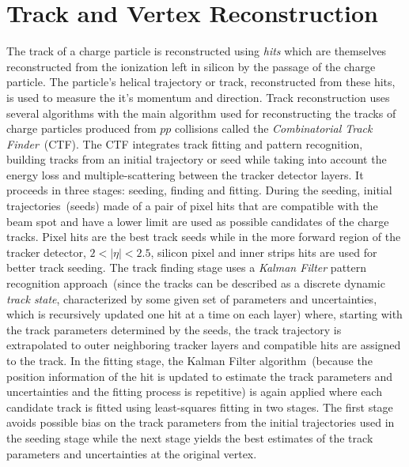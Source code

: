 \section{Track and Vertex Reconstruction}
The track of a charge particle is reconstructed using \textit{hits} which are themselves reconstructed from the ionization left in silicon by the passage of the charge particle. The particle's helical trajectory or track, reconstructed from these hits, is used to measure the it's momentum and direction.
\newline
Track reconstruction uses several algorithms with the main algorithm used for reconstructing the tracks of charge particles produced from $pp$ collisions called the \textit{Combinatorial Track Finder}~(CTF). The CTF integrates track fitting and pattern recognition, building tracks from an initial trajectory or seed while taking into account the energy loss and multiple-scattering between the tracker detector layers. It proceeds in three stages: seeding, finding and fitting.
\newline
During the seeding, initial trajectories~(seeds) made of a pair of pixel hits that are compatible with the beam spot and have a lower \pt limit are used as possible candidates of the charge tracks. Pixel hits are the best track seeds while in the more forward region of the tracker detector, $2 <|\eta| < 2.5$, silicon pixel and inner strips hits are used for better track seeding.
\newline
The track finding stage uses a \textit{Kalman Filter} pattern recognition approach~(since the tracks can be described as a discrete dynamic \textit{track state}, characterized by some given set of parameters and uncertainties, which is recursively updated one hit at a time on each layer) where, starting with the track parameters determined by the seeds, the track trajectory is extrapolated to outer neighboring tracker layers and compatible hits are assigned to the track. 
\newline
In the fitting stage, the Kalman Filter algorithm~(because the position information of the hit is updated to estimate the track parameters and uncertainties and the fitting process is repetitive) is again applied  where each candidate track is fitted using least-squares fitting in two stages. The first stage avoids possible bias on the track parameters from the initial trajectories used in the seeding stage while the next stage yields the best estimates of the track parameters and uncertainties at the original vertex.
\newline

